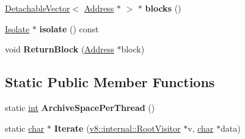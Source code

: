 \begin{DoxyCompactItemize}
\mbox{\label{classv8_1_1internal_1_1HandleScopeImplementer_aad929c5df5d8137e004d0a7f2bc57e48}} 
\mbox{\hyperlink{classv8_1_1internal_1_1DetachableVector}{Detachable\+Vector}}$<$ \mbox{\hyperlink{classuintptr__t}{Address}} $\ast$ $>$ $\ast$ {\bfseries blocks} ()
\item 
\mbox{\label{classv8_1_1internal_1_1HandleScopeImplementer_a60ee1da3d62bd31ef9a7c7d91b3ab6f9}} 
\mbox{\hyperlink{classv8_1_1internal_1_1Isolate}{Isolate}} $\ast$ {\bfseries isolate} () const
\item 
\mbox{\label{classv8_1_1internal_1_1HandleScopeImplementer_a8b9fb644d3bcba87368f8c124b658a38}} 
void {\bfseries Return\+Block} (\mbox{\hyperlink{classuintptr__t}{Address}} $\ast$block)
\end{DoxyCompactItemize}
\subsection*{Static Public Member Functions}
\begin{DoxyCompactItemize}
\item 
\mbox{\label{classv8_1_1internal_1_1HandleScopeImplementer_ae1a88c356c5413fc94977f71ef5915e7}} 
static \mbox{\hyperlink{classint}{int}} {\bfseries Archive\+Space\+Per\+Thread} ()
\item 
\mbox{\label{classv8_1_1internal_1_1HandleScopeImplementer_aca4c48fd35e2a6eeab808e7b1ce853c3}} 
static \mbox{\hyperlink{classchar}{char}} $\ast$ {\bfseries Iterate} (\mbox{\hyperlink{classv8_1_1internal_1_1RootVisitor}{v8\+::internal\+::\+Root\+Visitor}} $\ast$v, \mbox{\hyperlink{classchar}{char}} $\ast$data)
\end{DoxyCompactItemize}
